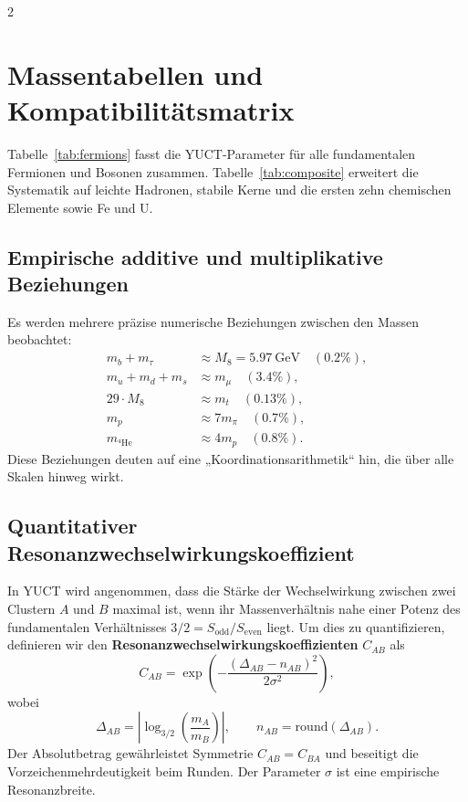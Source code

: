 \documentclass[11pt,a4paper]{article}
\begin{document}
	\begin{multicols}{2}
		
		\section{Massentabellen und Kompatibilitätsmatrix}
		\label{sec:tables}
		
		Tabelle~\ref{tab:fermions} fasst die YUCT-Parameter für alle fundamentalen Fermionen und Bosonen zusammen. Tabelle~\ref{tab:composite} erweitert die Systematik auf leichte Hadronen, stabile Kerne und die ersten zehn chemischen Elemente sowie Fe und U.
		
		\subsection{Empirische additive und multiplikative Beziehungen}
		
		Es werden mehrere präzise numerische Beziehungen zwischen den Massen beobachtet:
		\begin{align*}
			m_b + m_\tau &\approx M_8 = 5.97\ \text{GeV} \quad (0.2\%),\\
			m_u + m_d + m_s &\approx m_\mu \quad (3.4\%),\\
			29 \cdot M_8 &\approx m_t \quad (0.13\%),\\
			m_p &\approx 7 m_\pi \quad (0.7\%),\\
			m_{^4\mathrm{He}} &\approx 4 m_p \quad (0.8\%).
		\end{align*}
		Diese Beziehungen deuten auf eine „Koordinationsarithmetik“ hin, die über alle Skalen hinweg wirkt.
		
		\subsection{Quantitativer Resonanzwechselwirkungskoeffizient}
		
		In YUCT wird angenommen, dass die Stärke der Wechselwirkung zwischen zwei Clustern \(A\) und \(B\) maximal ist, wenn ihr Massenverhältnis nahe einer Potenz des fundamentalen Verhältnisses \(3/2 = S_{\mathrm{odd}}/S_{\mathrm{even}}\) liegt. Um dies zu quantifizieren, definieren wir den \textbf{Resonanzwechselwirkungskoeffizienten} \(C_{AB}\) als
		\begin{equation}
			C_{AB} = \exp\left( - \frac{(\Delta_{AB} - n_{AB})^2}{2\sigma^2} \right),
			\label{eq:CAB}
		\end{equation}
		wobei
		\[
		\Delta_{AB} = \left| \log_{3/2}\left( \frac{m_A}{m_B} \right) \right|, \qquad n_{AB} = \text{round}(\Delta_{AB}).
		\]
		Der Absolutbetrag gewährleistet Symmetrie \(C_{AB}=C_{BA}\) und beseitigt die Vorzeichenmehrdeutigkeit beim Runden. Der Parameter \(\sigma\) ist eine empirische Resonanzbreite.
		

\end{multicols}
\end{document}

